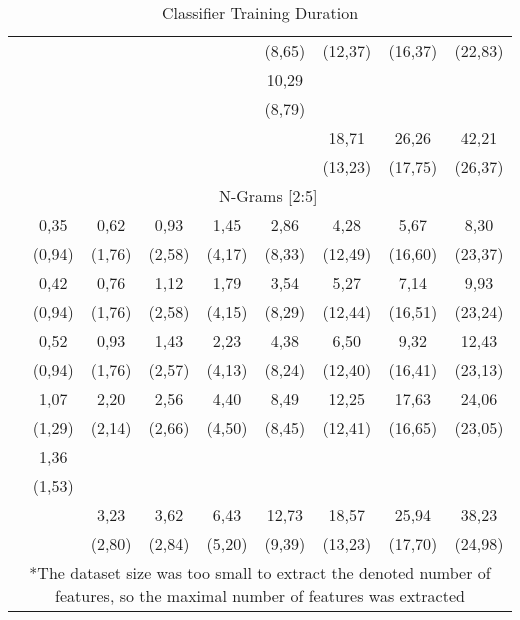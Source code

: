 \begin{table}[H]
\begin{tabular}{c| c c c c c c c c}
												& 	&	&	&	&	(8,65)	&	(12,37)	&	(16,37)	&(22,83)\\
						\vspace*{-2mm} 
						\multirow{2}{*}{3872*} & 	&	&	&	&	10,29	&	&	&	\\
											  & 	&	&	&	&	(8,79)	&	&	&  \\		     			  
						\vspace*{-2mm} 
						\multirow{2}{*}{5000} &	&	&	&	&	&	18,71	& 26,26	& 42,21 \\
							      			  &	&	&	&	&	&	(13,23)	& (17,75) &	(26,37) \\
						\hline
						& \multicolumn{8}{c}{N-Grams [2:5]} \\
						
						\cline{2-9}
						\vspace*{-2mm} 
						\multirow{2}{*}{100} & 0,35 & 0,62 & 0,93 &	1,45 & 2,86 & 4,28 & 5,67 & 8,30  \\
											 &(0,94) & (1,76) & (2,58) & (4,17) & (8,33) & (12,49) & (16,60) & (23,37)\\
						\vspace*{-2mm} 
						\multirow{2}{*}{500} & 0,42 & 0,76 & 1,12 & 1,79 & 3,54 & 5,27 & 7,14 & 9,93 \\
							& (0,94) & (1,76) & (2,58) & (4,15) & (8,29) & (12,44) & (16,51) & (23,24)\\
						\vspace*{-2mm} 
						\multirow{2}{*}{1000}& 0,52 & 0,93 & 1,43 & 2,23 & 4,38 & 6,50 & 9,32 & 12,43\\
							& (0,94) & (1,76) & (2,57) & (4,13) & (8,24) & (12,40) & (16,41) & (23,13)\\
						\vspace*{-2mm} 
						\multirow{2}{*}{3000}& 1,07 & 2,20 & 2,56 & 4,40 & 8,49 & 12,25 & 17,63 & 24,06 \\
							&(1,29) & (2,14) & (2,66) & (4,50) & (8,45) & (12,41) & (16,65) & (23,05)\\
						\vspace*{-2mm} 
						\multirow{2}{*}{4185*}&1,36 & & & & & & & \\
										     & (1,53)& & & & & & & \\
						\vspace*{-2mm} 
						\multirow{2}{*}{5000}& & 3,23 & 3,62 & 6,43 & 12,73 & 18,57 & 25,94 & 38,23 \\
											& &(2,80) & (2,84) & (5,20) & (9,39) & (13,23) & (17,70) & (24,98) \\
						\hline\hline
						\multicolumn{9}{p{1\textwidth}}{\footnotesize{*The dataset size was too small to extract the denoted number of features, so the maximal number of features was extracted}} \\
					\end{tabular}
				\caption[Classifier Duration]{Classifier Training Duration}
				\label{table:class_duration}
			\end{table}
		
